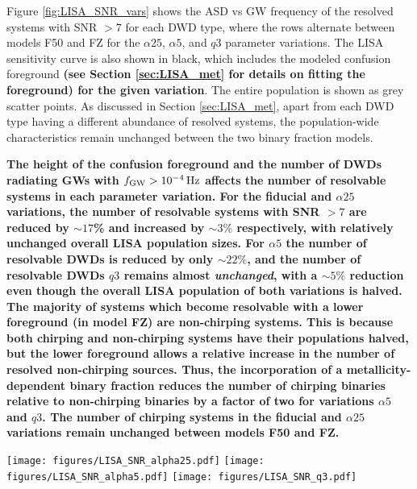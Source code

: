 \documentclass[twocolumn, linenumbers]{aastex631}
\begin{document}
Figure \ref{fig:LISA_SNR_vars} shows the ASD vs GW frequency of the resolved systems with SNR $> 7$ for each DWD type, where the rows alternate between models F50 and FZ for the $\alpha25$, $\alpha5$, and $q3$ parameter variations. The LISA sensitivity curve is also shown in black, which includes the modeled confusion foreground \textbf{(see Section \ref{sec:LISA_met} for details on fitting the foreground) for the given variation}. The entire population is shown as grey scatter points. As discussed in Section \ref{sec:LISA_met}, apart from each DWD type having a different abundance of resolved systems, the population-wide characteristics remain unchanged between the two binary fraction models.

\textbf{The height of the confusion foreground and the number of DWDs radiating GWs with $f_{\rm{GW}} > 10^{-4}\,\rm{Hz}$ affects the number of resolvable systems in each parameter variation. For the fiducial and $\alpha25$ variations, the number of resolvable systems with SNR $>7$ are reduced by $\sim 17$\% and increased by $\sim3\%$ respectively, with relatively unchanged overall LISA population sizes. For $\alpha5$ the number of resolvable DWDs is reduced by only $\sim 22\%$, and the number of resolvable DWDs $q3$ remains almost \emph{unchanged}, with a $\sim 5\%$ reduction even though the overall LISA population of both variations is halved. The majority of systems which become resolvable with a lower foreground (in model FZ) are non-chirping systems. This is because both chirping and non-chirping systems have their populations halved, but the lower foreground allows a relative increase in the number of resolved non-chirping sources. Thus, the incorporation of a metallicity-dependent binary fraction reduces the number of chirping binaries relative to non-chirping binaries by a factor of two for variations $\alpha5$ and $q3$. The number of chirping systems in the fiducial and $\alpha25$ variations remain unchanged between models F50 and FZ.} 


\begin{figure*}[h]
    \centering
	\texttt{[image: figures/LISA\_SNR\_alpha25.pdf]}
	\texttt{[image: figures/LISA\_SNR\_alpha5.pdf]}
	\texttt{[image: figures/LISA\_SNR\_q3.pdf]}
    \caption{The ASD vs GW frequency for DWDs resolved with SNR $> 7$ for each DWD type and parameter variation. The rows alternate between model F50 and model FZ. In each panel, the LISA sensitivity curve, including the confusion foreground for each model, is shown in black and the total population for each model is shown in grey. Again, we find that each model qualitatively exhibits similar characteristics and that the only change is in the yield of resolved DWDs for each type based on the strength of the confusion foreground.}
    \label{fig:LISA_SNR_vars}

\end{figure*}
\end{document}
